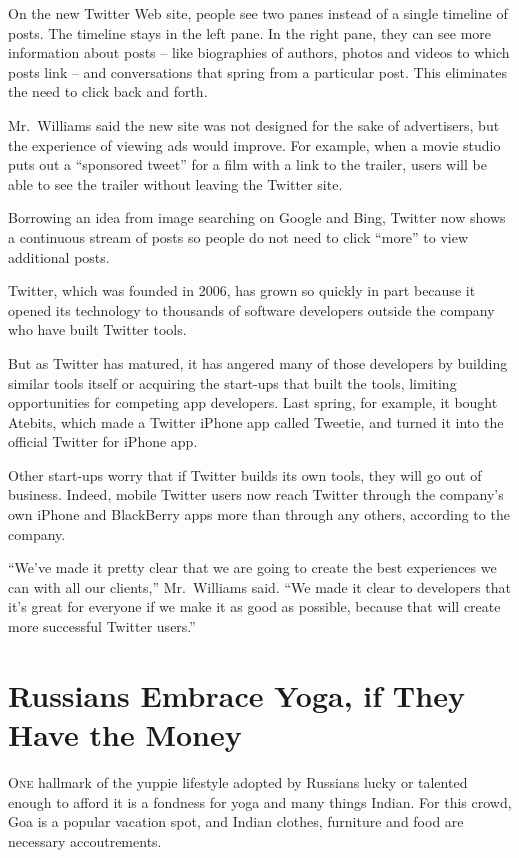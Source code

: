 ﻿\documentclass[12pt]{article}
\begin{document}
On the new Twitter Web site, people see two panes instead of a single timeline of posts. The
timeline stays in the left pane. In the right pane, they can see more information about posts --
like biographies of authors, photos and videos to which posts link -- and conversations that spring
from a particular post. This eliminates the need to click back and forth.

Mr.~Williams said the new site was not designed for the sake of advertisers, but the experience of
viewing ads would improve. For example, when a movie studio puts out a ``sponsored tweet'' for a
film with a link to the trailer, users will be able to see the trailer without leaving the Twitter
site.

Borrowing an idea from image searching on Google and Bing, Twitter now shows a continuous stream of
posts so people do not need to click ``more'' to view additional posts.

Twitter, which was founded in 2006, has grown so quickly in part because it opened its technology to
thousands of software developers outside the company who have built Twitter tools.

But as Twitter has matured, it has angered many of those developers by building similar tools itself
or acquiring the start-ups that built the tools, limiting opportunities for competing app
developers. Last spring, for example, it bought Atebits, which made a Twitter iPhone app called
Tweetie, and turned it into the official Twitter for iPhone app.

Other start-ups worry that if Twitter builds its own tools, they will go out of business. Indeed,
mobile Twitter users now reach Twitter through the company's own iPhone and BlackBerry apps more
than through any others, according to the company.

``We've made it pretty clear that we are going to create the best experiences we can with all our
clients,'' Mr.~Williams said. ``We made it clear to developers that it's great for everyone if we
make it as good as possible, because that will create more successful Twitter users.''

\pagebreak
\section{Russians Embrace Yoga, if They Have the Money}

\lettrine{O}{ne} hallmark of the yuppie lifestyle adopted by Russians lucky
or talented enough to afford it is a fondness for yoga and many things Indian. For this crowd, Goa
is a popular vacation spot, and Indian clothes, furniture and food are necessary accoutrements.
\end{document}
